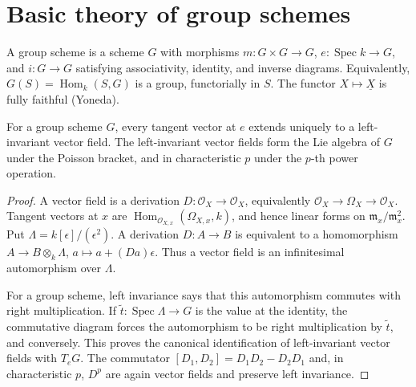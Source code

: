 \section{Basic theory of group schemes}
\label{mumford-III11-source}

\begin{definition}
\label{mumford-def-group-scheme}
A group scheme is a scheme $G$ with morphisms $m:G\times G\to G$,
$e:\operatorname{Spec}k\to G$, and $i:G\to G$ satisfying associativity,
identity, and inverse diagrams. Equivalently, $G(S)=\operatorname{Hom}_k(S,G)$
is a group, functorially in $S$. The functor $X\mapsto\underline X$ is fully
faithful (Yoneda).
\end{definition}

\begin{proposition}
\label{mumford-prop-group-scheme-lie}
For a group scheme $G$, every tangent vector at $e$ extends uniquely to a
left-invariant vector field. The left-invariant vector fields form the Lie
algebra of $G$ under the Poisson bracket, and in characteristic $p$ under
the $p$-th power operation.
\end{proposition}
\begin{proof}
A vector field is a derivation $D:\mathcal O_X\to\mathcal O_X$, equivalently
$\mathcal O_X\to\Omega_X\to\mathcal O_X$. Tangent vectors at $x$ are
$\operatorname{Hom}_{\mathcal O_{X,x}}(\Omega_{X,x},k)$, and hence linear
forms on $\mathfrak m_x/\mathfrak m_x^2$. Put
$\Lambda=k[\epsilon]/(\epsilon^2)$. A derivation $D:A\to B$ is equivalent
to a homomorphism $A\to B\otimes_k\Lambda$, $a\mapsto a+(Da)\epsilon$.
Thus a vector field is an infinitesimal automorphism over $\Lambda$.

For a group scheme, left invariance says that this automorphism commutes with
right multiplication. If $\widetilde t:\operatorname{Spec}\Lambda\to G$ is
the value at the identity, the commutative diagram forces the automorphism to
be right multiplication by $\widetilde t$, and conversely. This proves the
canonical identification of left-invariant vector fields with $T_eG$.
The commutator $[D_1,D_2]=D_1D_2-D_2D_1$ and, in characteristic $p$, $D^p$
are again vector fields and preserve left invariance.
\end{proof}

